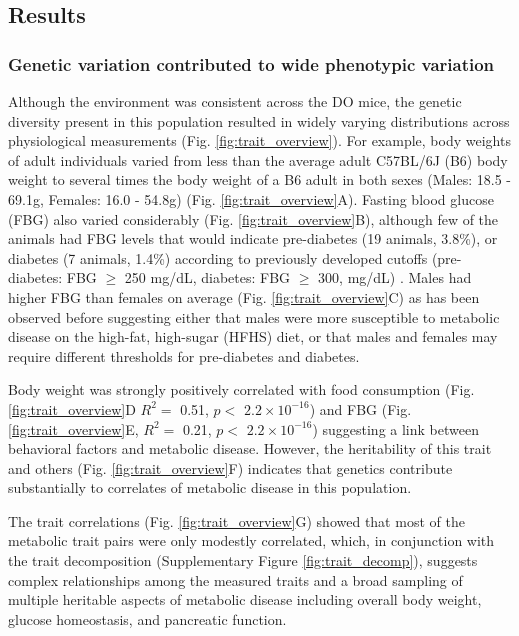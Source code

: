 \documentclass[
]{article}
\begin{document}
\subsection{Results}\label{results}

\subsubsection{Genetic variation contributed to wide phenotypic
variation}\label{genetic-variation-contributed-to-wide-phenotypic-variation}

Although the environment was consistent across the DO mice, the genetic
diversity present in this population resulted in widely varying
distributions across physiological measurements (Fig.
\ref{fig:trait_overview}). For example, body weights of adult
individuals varied from less than the average adult C57BL/6J (B6) body
weight to several times the body weight of a B6 adult in both sexes
(Males: 18.5 - 69.1g, Females: 16.0 - 54.8g) (Fig.
\ref{fig:trait_overview}A). Fasting blood glucose (FBG) also varied
considerably (Fig. \ref{fig:trait_overview}B), although few of the
animals had FBG levels that would indicate pre-diabetes (19 animals,
3.8\%), or diabetes (7 animals, 1.4\%) according to previously developed
cutoffs (pre-diabetes: FBG \(\geq\) 250 mg/dL, diabetes: FBG \(\geq\)
300, mg/dL) \cite{pmid17018838}. Males had higher FBG than females on
average (Fig. \ref{fig:trait_overview}C) as has been observed before
suggesting either that males were more susceptible to metabolic disease
on the high-fat, high-sugar (HFHS) diet, or that males and females may
require different thresholds for pre-diabetes and diabetes.

Body weight was strongly positively correlated with food consumption
(Fig. \ref{fig:trait_overview}D \(R^2 =\) 0.51, \(p<\)
\ensuremath{2.2\times 10^{-16}}) and FBG (Fig.
\ref{fig:trait_overview}E, \(R^2=\) 0.21, \(p <\)
\ensuremath{2.2\times 10^{-16}}) suggesting a link between behavioral
factors and metabolic disease. However, the heritability of this trait
and others (Fig. \ref{fig:trait_overview}F) indicates that genetics
contribute substantially to correlates of metabolic disease in this
population.

The trait correlations (Fig. \ref{fig:trait_overview}G) showed that most
of the metabolic trait pairs were only modestly correlated, which, in
conjunction with the trait decomposition (Supplementary Figure
\ref{fig:trait_decomp}), suggests complex relationships among the
measured traits and a broad sampling of multiple heritable aspects of
metabolic disease including overall body weight, glucose homeostasis,
and pancreatic function.
\end{document}
